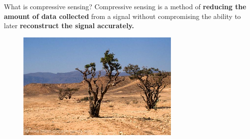 \documentclass{beamer}
\begin{document}

 \begin{frame}{What is compressive sensing?}
Compressive sensing is a method of \textbf{reducing the amount of data collected} from a signal without compromising the ability to later \textbf{reconstruct the signal accurately.}%

\begin{figure}[h]
        \centering
        \includegraphics[width = 8cm]{sparseD.jpg}
       \end{figure}

\end{frame}
\end{document}
